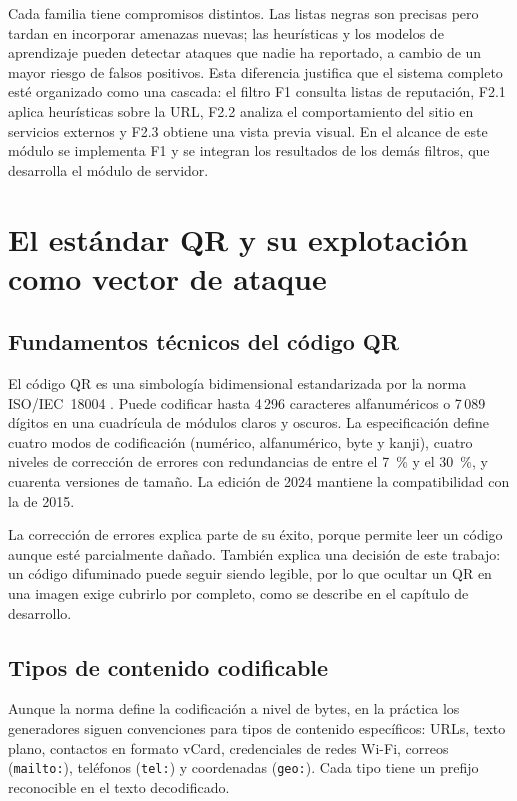 Cada familia tiene compromisos distintos. Las listas negras son precisas pero tardan en incorporar amenazas nuevas; las heurísticas y los modelos de aprendizaje pueden detectar ataques que nadie ha reportado, a cambio de un mayor riesgo de falsos positivos. Esta diferencia justifica que el sistema completo esté organizado como una cascada: el filtro F1 consulta listas de reputación, F2.1 aplica heurísticas sobre la URL, F2.2 analiza el comportamiento del sitio en servicios externos y F2.3 obtiene una vista previa visual. En el alcance de este módulo se implementa F1 y se integran los resultados de los demás filtros, que desarrolla el módulo de servidor.

\section{El estándar QR y su explotación como vector de ataque}

\subsection{Fundamentos técnicos del código QR}

El código QR es una simbología bidimensional estandarizada por la norma ISO/IEC~18004 \cite{iso18004_2015,iso18004_2024}. Puede codificar hasta 4\,296 caracteres alfanuméricos o 7\,089 dígitos en una cuadrícula de módulos claros y oscuros. La especificación define cuatro modos de codificación (numérico, alfanumérico, byte y kanji), cuatro niveles de corrección de errores con redundancias de entre el 7~\% y el 30~\%, y cuarenta versiones de tamaño. La edición de 2024 mantiene la compatibilidad con la de 2015.

La corrección de errores explica parte de su éxito, porque permite leer un código aunque esté parcialmente dañado. También explica una decisión de este trabajo: un código difuminado puede seguir siendo legible, por lo que ocultar un QR en una imagen exige cubrirlo por completo, como se describe en el capítulo de desarrollo.

\subsection{Tipos de contenido codificable}

Aunque la norma define la codificación a nivel de bytes, en la práctica los generadores siguen convenciones para tipos de contenido específicos: URLs, texto plano, contactos en formato vCard, credenciales de redes Wi-Fi, correos (\texttt{mailto:}), teléfonos (\texttt{tel:}) y coordenadas (\texttt{geo:}). Cada tipo tiene un prefijo reconocible en el texto decodificado.

